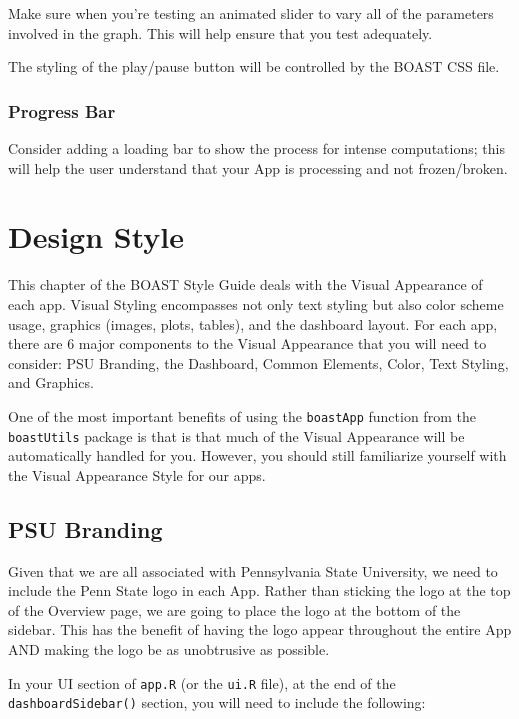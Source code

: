 \documentclass[
]{book}
\begin{document}
Make sure when you're testing an animated slider to vary all of the parameters involved in the graph. This will help ensure that you test adequately.

The styling of the play/pause button will be controlled by the BOAST CSS file.

\hypertarget{progress-bar}{%
\subsection{Progress Bar}\label{progress-bar}}

Consider adding a loading bar to show the process for intense computations; this will help the user understand that your App is processing and not frozen/broken.

\hypertarget{designStyle}{%
\chapter{Design Style}\label{designStyle}}

This chapter of the BOAST Style Guide deals with the Visual Appearance of each app. Visual Styling encompasses not only text styling but also color scheme usage, graphics (images, plots, tables), and the dashboard layout. For each app, there are 6 major components to the Visual Appearance that you will need to consider: PSU Branding, the Dashboard, Common Elements, Color, Text Styling, and Graphics.

One of the most important benefits of using the \texttt{boastApp} function from the \texttt{boastUtils} package is that is that much of the Visual Appearance will be automatically handled for you. However, you should still familiarize yourself with the Visual Appearance Style for our apps.

\hypertarget{logo}{%
\section{PSU Branding}\label{logo}}

Given that we are all associated with Pennsylvania State University, we need to include the Penn State logo in each App. Rather than sticking the logo at the top of the Overview page, we are going to place the logo at the bottom of the sidebar. This has the benefit of having the logo appear throughout the entire App AND making the logo be as unobtrusive as possible.

In your UI section of \texttt{app.R} (or the \texttt{ui.R} file), at the end of the \texttt{dashboardSidebar()} section, you will need to include the following:
\end{document}
